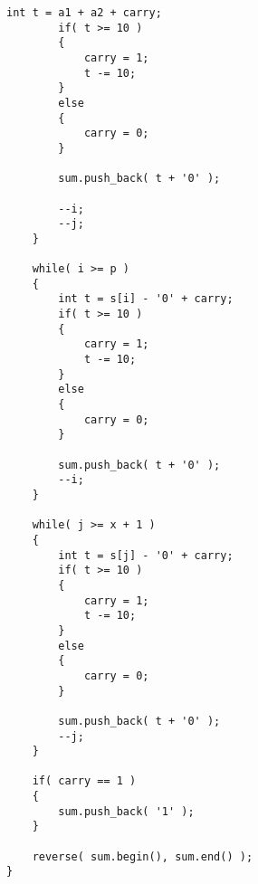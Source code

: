 \begin{lstlisting}[style=customc, caption={Recursion}]
        int t = a1 + a2 + carry;
        if( t >= 10 )
        {
            carry = 1;
            t -= 10;
        }
        else
        {
            carry = 0;
        }

        sum.push_back( t + '0' );

        --i;
        --j;
    }

    while( i >= p )
    {
        int t = s[i] - '0' + carry;
        if( t >= 10 )
        {
            carry = 1;
            t -= 10;
        }
        else
        {
            carry = 0;
        }

        sum.push_back( t + '0' );
        --i;
    }

    while( j >= x + 1 )
    {
        int t = s[j] - '0' + carry;
        if( t >= 10 )
        {
            carry = 1;
            t -= 10;
        }
        else
        {
            carry = 0;
        }

        sum.push_back( t + '0' );
        --j;
    }

    if( carry == 1 )
    {
        sum.push_back( '1' );
    }

    reverse( sum.begin(), sum.end() );
}

\end{lstlisting}